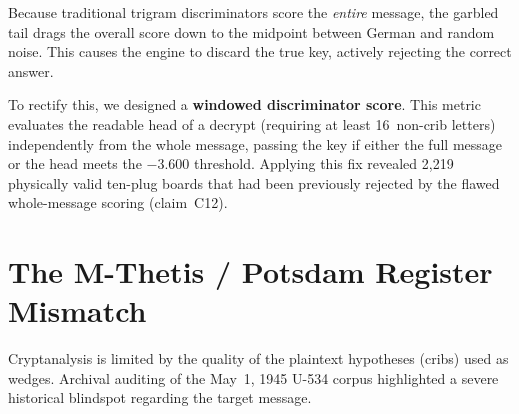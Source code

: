 \documentclass[11pt,a4paper]{article}
\begin{document}
Because traditional trigram discriminators score the \emph{entire}
message, the garbled tail drags the overall score down to the midpoint
between German and random noise.
This causes the engine to discard the true key, actively rejecting the
correct answer.

To rectify this, we designed a \textbf{windowed discriminator score}.
This metric evaluates the readable head of a decrypt (requiring at least
16~non-crib letters) independently from the whole message, passing the
key if either the full message or the head meets the $-3.600$ threshold.
Applying this fix revealed 2{,}219 physically valid ten-plug boards that
had been previously rejected by the flawed whole-message scoring
(claim~C12).

\section{The M-Thetis / Potsdam Register Mismatch}

Cryptanalysis is limited by the quality of the plaintext hypotheses
(cribs) used as wedges.
Archival auditing of the May~1, 1945 U-534 corpus highlighted a severe
historical blindspot regarding the target message.
\end{document}
